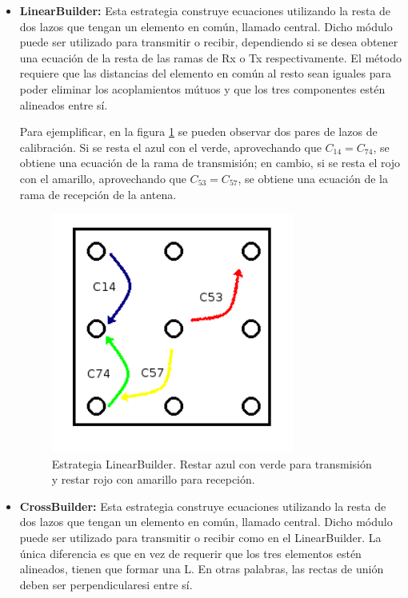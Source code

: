 \begin{itemize}
	\item \textbf{LinearBuilder:} Esta estrategia construye ecuaciones utilizando la resta de dos lazos que tengan un elemento en 
		común, llamado central. Dicho módulo puede ser utilizado para transmitir o recibir, dependiendo si se desea obtener una 
        ecuación de la resta de las ramas de Rx o Tx respectivamente. El método requiere que las distancias del elemento en común
        al resto sean iguales para poder eliminar los acoplamientos mútuos y que los tres componentes estén alineados entre sí.
         
		Para ejemplificar, en la figura \ref{fig:linealBuilder} se pueden observar dos pares de lazos de calibración. Si se resta el
        azul con el verde, aprovechando que $C_{14} = C_{74}$, se obtiene una ecuación de la rama de transmisión; en cambio, 
        si se resta el rojo con el amarillo, aprovechando que $C_{53} = C_{57}$, se obtiene una ecuación de la rama de 
        recepción de la antena.
			
		\begin{figure}[H]
		 \centering
		 \includegraphics[width=8cm]{gfx/linearBuilder.png}
		 \caption{Estrategia LinearBuilder. Restar azul con verde para transmisión y restar rojo con amarillo para recepción.}
		 \label{fig:linealBuilder}
		\end{figure}

	\item \textbf{CrossBuilder:} Esta estrategia construye ecuaciones utilizando la resta de dos lazos que tengan un elemento en 
		común, llamado central. Dicho módulo puede ser utilizado para transmitir o recibir como en el LinearBuilder. La única 
        diferencia es que en vez de requerir que los tres elementos estén alineados, tienen que formar una L. En otras palabras,
        las rectas de unión deben ser perpendicularesi entre sí.
		

\end{itemize}
